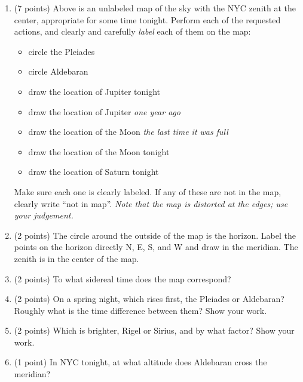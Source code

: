 \documentclass[12pt]{article}
\begin{document}
\begin{enumerate}

\item (7 points)
Above is an unlabeled map of the sky with the NYC zenith at the
center, appropriate for some time tonight.  Perform each of the
requested actions, and clearly and carefully \emph{label} each of them
on the map:
\begin{itemize}
\item circle the Pleiades
\item circle Aldebaran
\item draw the location of Jupiter tonight
\item draw the location of Jupiter \emph{one year ago}
\item draw the location of the Moon \emph{the last time it was full}
\item draw the location of the Moon tonight
\item draw the location of Saturn tonight
\end{itemize}
Make sure each one is clearly labeled.  If any of these are not in the
map, clearly write ``not in map''.  \emph{Note that the map is
distorted at the edges; use your judgement.}

\item (2 points)
The circle around the outside of the map is the horizon.  Label the
points on the horizon directly N, E, S, and W and draw in the
meridian.  The zenith is in the center of the map.

\item (2 points)
To what sidereal time does the map correspond?

\vspace{0.5in}

\item (2 points)
On a spring night, which rises first, the Pleiades or Aldebaran?
Roughly what is the time difference between them?  Show your work.

\vspace{1in}

\item (2 points)
Which is brighter, Rigel or Sirius, and by what factor?  Show your
work.

\vspace{1in}

\item (1 point)
In NYC tonight, at what altitude does Aldebaran cross the meridian?

\vspace{0.5in}


\end{enumerate}
\end{document}
